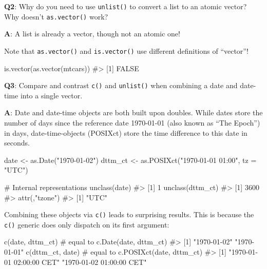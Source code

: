 \documentclass[
]{krantz}
\makeatletter
\newenvironment{Shaded}{\begin{snugshade}}{\end{snugshade}}
\newcommand{\CommentTok}[1]{\textcolor[rgb]{0.56,0.35,0.01}{\textit{#1}}}
\newcommand{\DataTypeTok}[1]{\textcolor[rgb]{0.13,0.29,0.53}{#1}}
\newcommand{\KeywordTok}[1]{\textcolor[rgb]{0.13,0.29,0.53}{\textbf{#1}}}
\newcommand{\NormalTok}[1]{#1}
\newcommand{\StringTok}[1]{\textcolor[rgb]{0.31,0.60,0.02}{#1}}
\newenvironment{kframe}{%
\medskip{}
\setlength{\fboxsep}{.8em}
 \def\at@end@of@kframe{}%
 \ifinner\ifhmode%
  \def\at@end@of@kframe{\end{minipage}}%
  \begin{minipage}{\columnwidth}%
 \fi\fi%
 \def\FrameCommand##1{\hskip\@totalleftmargin \hskip-\fboxsep
 \colorbox{shadecolor}{##1}\hskip-\fboxsep
     \hskip-\linewidth \hskip-\@totalleftmargin \hskip\columnwidth}%
 \MakeFramed {\advance\hsize-\width
   \@totalleftmargin\z@ \linewidth\hsize
   \@setminipage}}%
 {\par\unskip\endMakeFramed%
 \at@end@of@kframe}
\renewenvironment{Shaded}{\begin{kframe}}{\end{kframe}}
\renewcommand{\KeywordTok} [1]{\textcolor[rgb]{0.00,0.44,0.13}{{#1}}}
\renewcommand{\DataTypeTok}[1]{\textcolor[rgb]{0.56,0.13,0.00}{{#1}}}
\renewcommand{\StringTok}  [1]{\textcolor[rgb]{0.25,0.44,0.63}{{#1}}}
\renewcommand{\CommentTok} [1]{\textcolor[rgb]{0.38,0.63,0.69}{{#1}}}
\renewcommand{\NormalTok}  [1]{{#1}}
\makeatother
\begin{document}
\textbf{{Q2}}: Why do you need to use \texttt{unlist()} to convert a list to an atomic vector? Why doesn't \texttt{as.vector()} work?

\textbf{{A}}: A list is already a vector, though not an atomic one!

Note that \texttt{as.vector()} and \texttt{is.vector()} use different definitions of
``vector''!

\begin{Shaded}
\begin{Highlighting}[]
\KeywordTok{is.vector}\NormalTok{(}\KeywordTok{as.vector}\NormalTok{(mtcars))}
\CommentTok{#> [1] FALSE}
\end{Highlighting}
\end{Shaded}

\textbf{{Q3}}: Compare and contrast \texttt{c()} and \texttt{unlist()} when combining a date and date-time into a single vector.

\textbf{{A}}: Date and date-time objects are both built upon doubles. While dates store the number of days since the reference date 1970-01-01 (also known as ``The Epoch'') in days, date-time-objects (POSIXct) store the time difference to this date in seconds.

\begin{Shaded}
\begin{Highlighting}[]
\NormalTok{date    <-}\StringTok{ }\KeywordTok{as.Date}\NormalTok{(}\StringTok{"1970-01-02"}\NormalTok{)}
\NormalTok{dttm_ct <-}\StringTok{ }\KeywordTok{as.POSIXct}\NormalTok{(}\StringTok{"1970-01-01 01:00"}\NormalTok{, }\DataTypeTok{tz =} \StringTok{"UTC"}\NormalTok{)}


\CommentTok{# Internal representations}
\KeywordTok{unclass}\NormalTok{(date)}
\CommentTok{#> [1] 1}
\KeywordTok{unclass}\NormalTok{(dttm_ct)}
\CommentTok{#> [1] 3600}
\CommentTok{#> attr(,"tzone")}
\CommentTok{#> [1] "UTC"}
\end{Highlighting}
\end{Shaded}

Combining these objects via \texttt{c()} leads to surprising results. This is because the \texttt{c()} generic does only dispatch on its first argument:

\begin{Shaded}
\begin{Highlighting}[]
\KeywordTok{c}\NormalTok{(date, dttm_ct)  }\CommentTok{# equal to c.Date(date, dttm_ct) }
\CommentTok{#> [1] "1970-01-02" "1970-01-01"}
\KeywordTok{c}\NormalTok{(dttm_ct, date)  }\CommentTok{# equal to c.POSIXct(date, dttm_ct)}
\CommentTok{#> [1] "1970-01-01 02:00:00 CET" "1970-01-02 01:00:00 CET"}
\end{Highlighting}
\end{Shaded}
\end{document}
